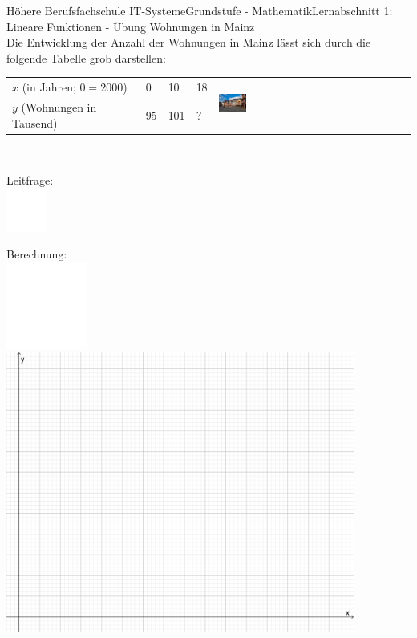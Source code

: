 \documentclass[oneside,openany,headings=optiontotoc,11pt,numbers=noenddot]{scrreprt}
\begin{document}
	\begin{worksheet}{Höhere Berufsfachschule IT-Systeme}{Grundstufe - Mathematik}{Lernabschnitt 1: Lineare Funktionen - Übung}
		\noindent
		\LARGE Wohnungen in Mainz\\
		\normalsize
		\noindent
		Die Entwicklung der Anzahl der Wohnungen in Mainz lässt sich durch die folgende Tabelle grob darstellen:\\
		\par\noindent
		\begin{tabularx}{\columnwidth}{|X|l|l|l|M}
			\(x\) (in Jahren; \(0 = 2000\)) & 0 & 10 & 18 & \\
			\(y\) (Wohnungen in Tausend) & 95 & 101 & ?\\
		\end{tabularx}\\
		\begin{framed}
			\noindent
			\small{\color{codegray}Leitfrage:}\\
			\includegraphics[width=0.1\textwidth]{../../empty.jpg}\\
		\end{framed}
		\begin{framed}
			\noindent
			\small{\color{codegray}Berechnung:}\\
			\includegraphics[width=0.2\textwidth]{../../empty.jpg}\\
			\includegraphics[width=0.86\textwidth]{../99_Bilder/KoordLeer.png}

\end{framed}
\end{worksheet}
\end{document}
